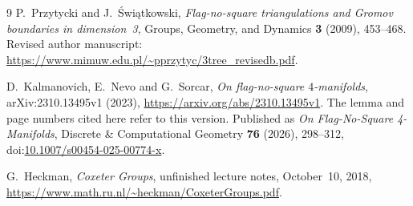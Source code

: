 \documentclass[11pt]{article}
\begin{document}
\begin{thebibliography}{9}
P.~Przytycki and J.~\'{S}wi\k{a}tkowski,
\emph{Flag-no-square triangulations and Gromov boundaries in dimension~3},
Groups, Geometry, and Dynamics \textbf{3} (2009), 453--468.
Revised author manuscript:
\url{https://www.mimuw.edu.pl/~pprzytyc/3tree_revisedb.pdf}.

D.~Kalmanovich, E.~Nevo and G.~Sorcar,
\emph{On flag-no-square $4$-manifolds},
arXiv:2310.13495v1 (2023),
\url{https://arxiv.org/abs/2310.13495v1}.
The lemma and page numbers cited here refer to this version.
Published as \emph{On Flag-No-Square 4-Manifolds},
Discrete \& Computational Geometry \textbf{76} (2026), 298--312,
doi:\href{https://doi.org/10.1007/s00454-025-00774-x}
{10.1007/s00454-025-00774-x}.

G.~Heckman,
\emph{Coxeter Groups}, unfinished lecture notes,
October~10, 2018,
\url{https://www.math.ru.nl/~heckman/CoxeterGroups.pdf}.
\end{thebibliography}
\end{document}
